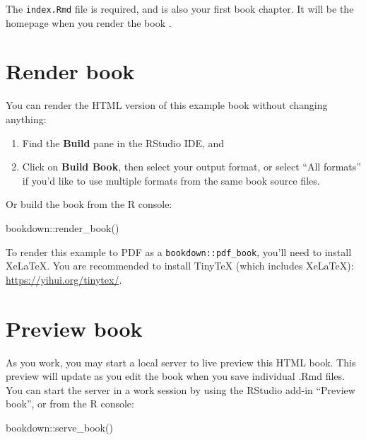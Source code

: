 \documentclass[
  12pt,
  twoside]{book}
\newenvironment{Shaded}{\begin{snugshade}}{\end{snugshade}}
\newcommand{\FunctionTok}[1]{\textcolor[rgb]{0.00,0.00,0.00}{#1}}
\newcommand{\NormalTok}[1]{#1}
\newcommand{\SpecialCharTok}[1]{\textcolor[rgb]{0.00,0.00,0.00}{#1}}
\theoremstyle{definition}
\theoremstyle{definition}
\theoremstyle{definition}
\theoremstyle{definition}
\theoremstyle{remark}
\begin{document}
The \texttt{index.Rmd} file is required, and is also your first book chapter. It will be the homepage when you render the book .

\hypertarget{render-book}{%
\section{Render book}\label{render-book}}

You can render the HTML version of this example book without changing anything:

\begin{enumerate}
\def\labelenumi{\arabic{enumi}.}
\item
  Find the \textbf{Build} pane in the RStudio IDE, and
\item
  Click on \textbf{Build Book}, then select your output format, or select ``All formats'' if you'd like to use multiple formats from the same book source files.
\end{enumerate}

Or build the book from the R console:

\begin{Shaded}
\begin{Highlighting}[]
\NormalTok{bookdown}\SpecialCharTok{::}\FunctionTok{render\_book}\NormalTok{()}
\end{Highlighting}
\end{Shaded}

To render this example to PDF  as a \texttt{bookdown::pdf\_book}, you'll need to install XeLaTeX. You are recommended to install TinyTeX (which includes XeLaTeX): \url{https://yihui.org/tinytex/}.

\hypertarget{preview-book}{%
\section{\texorpdfstring{Preview book }{Preview book }}\label{preview-book}}

As you work, you may start a local server to live preview this HTML book. This preview will update as you edit the book when you save individual .Rmd files. You can start the server in a work session by using the RStudio add-in ``Preview book'', or from the R console:

\begin{Shaded}
\begin{Highlighting}[]
\NormalTok{bookdown}\SpecialCharTok{::}\FunctionTok{serve\_book}\NormalTok{()}
\end{Highlighting}
\end{Shaded}
\end{document}
